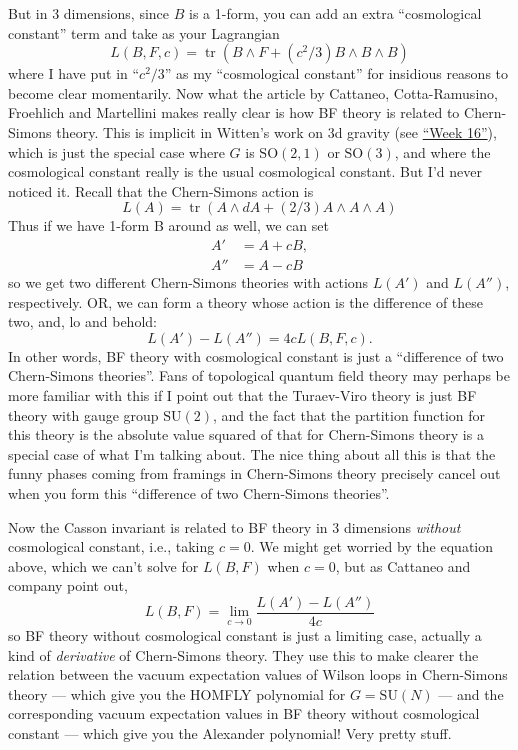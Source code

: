 \documentclass{article}
\begin{document}
But in 3 dimensions, since \(B\) is a 1-form, you can add an extra
``cosmological constant'' term and take as your Lagrangian
\[L(B,F,c) = \operatorname{tr}(B \wedge F + (c^2/3) B \wedge B \wedge B)\]
where I have put in ``\(c^2/3\)'' as my ``cosmological constant'' for
insidious reasons to become clear momentarily. Now what the article by
Cattaneo, Cotta-Ramusino, Froehlich and Martellini makes really clear is
how BF theory is related to Chern-Simons theory. This is implicit in
Witten's work on 3d gravity (see \protect\hyperlink{week16}{``Week
16''}), which is just the special case where \(G\) is
\(\mathrm{SO}(2,1)\) or \(\mathrm{SO}(3)\), and where the cosmological
constant really is the usual cosmological constant. But I'd never
noticed it. Recall that the Chern-Simons action is
\[L(A) = \operatorname{tr}(A \wedge dA + (2/3)A \wedge A \wedge A)\]
Thus if we have 1-form B around as well, we can set \[
  \begin{aligned}
    A' &= A + cB,
  \\A'' &= A - cB
  \end{aligned}
\] so we get two different Chern-Simons theories with actions \(L(A')\)
and \(L(A'')\), respectively. OR, we can form a theory whose action is
the difference of these two, and, lo and behold:
\[L(A') - L(A'') = 4cL(B,F,c).\] In other words, BF theory with
cosmological constant is just a ``difference of two Chern-Simons
theories''. Fans of topological quantum field theory may perhaps be more
familiar with this if I point out that the Turaev-Viro theory is just BF
theory with gauge group \(\mathrm{SU}(2)\), and the fact that the
partition function for this theory is the absolute value squared of that
for Chern-Simons theory is a special case of what I'm talking about. The
nice thing about all this is that the funny phases coming from framings
in Chern-Simons theory precisely cancel out when you form this
``difference of two Chern-Simons theories''.

Now the Casson invariant is related to BF theory in 3 dimensions
\emph{without} cosmological constant, i.e., taking \(c = 0\). We might
get worried by the equation above, which we can't solve for \(L(B,F)\)
when \(c = 0\), but as Cattaneo and company point out,
\[L(B,F) = \lim_{c\to0}\frac{L(A')-L(A'')}{4c}\] so BF theory without
cosmological constant is just a limiting case, actually a kind of
\emph{derivative} of Chern-Simons theory. They use this to make clearer
the relation between the vacuum expectation values of Wilson loops in
Chern-Simons theory --- which give you the HOMFLY polynomial for
\(G = \mathrm{SU}(N)\) --- and the corresponding vacuum expectation
values in BF theory without cosmological constant --- which give you the
Alexander polynomial! Very pretty stuff.
\end{document}
